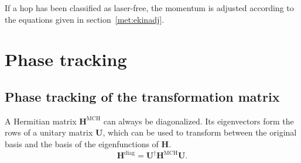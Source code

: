 \documentclass[a4paper,11pt,DIV=15,openany,twoside=false]{scrbook}
\renewcommand{\vec}[1]{\ensuremath{\mathbf{#1}}}
\begin{document}
If a hop has been classified as laser-free, the momentum is adjusted according to the equations given in section~\ref{met:ekinadj}.

\section{Phase tracking}

\subsection{Phase tracking of the transformation matrix}\label{met:phase_track}

A Hermitian matrix $\vec{H}^{\text{MCH}}$ can always be diagonalized. Its eigenvectors form the rows of a unitary matrix $\vec{U}$, which can be used to transform between the original basis and the basis of the eigenfunctions of $\vec{H}$. 
\begin{equation}
  \vec{H}^{\text{diag}}=\vec{U}^\dagger\vec{H}^{\text{MCH}}\vec{U}.
\end{equation}
\end{document}
